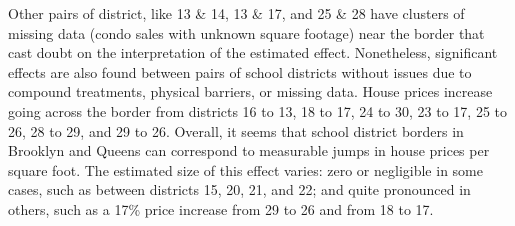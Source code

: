 	Other pairs of district, like 13 \& 14, 13 \& 17, and 25 \& 28 have clusters of missing data (condo sales with unknown square footage) near the border that cast doubt on the interpretation of the estimated effect.
Nonetheless, significant effects are also found between pairs of school districts without issues due to compound treatments, physical barriers, or missing data.
House prices increase going across the border from districts 16 to 13, 18 to 17, 24 to 30, 23 to 17, 25 to 26, 28 to 29, and 29 to 26.
Overall, it seems that school district borders in Brooklyn and Queens can correspond to measurable jumps in house prices per square foot.
The estimated size of this effect varies: zero or negligible in some cases, such as between districts 15, 20, 21, and 22; and quite pronounced in others, such as a 17\% price increase from 29 to 26 and from 18 to 17.

